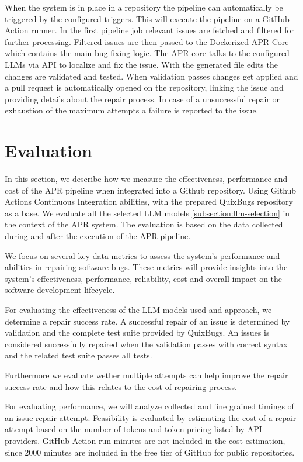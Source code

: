 When the system is in place in a repository the pipeline can automatically be triggered by the configured triggers. This will execute the pipeline on a GitHub Action runner. In the first pipeline job relevant issues are fetched and filtered for further processing. Filtered issues are then passed to the Dockerized APR Core which contains the main bug fixing logic. The APR core talks to the configured LLMs via API to localize and fix the issue. With the generated file edits the changes are validated and tested. When validation passes changes get applied and a pull request is automatically opened on the repository, linking the issue and providing details about the repair process. In case of a unsuccessful repair or exhaustion of the maximum attempts a failure is reported to the issue.

\section{Evaluation} \label{section:evaluation}
In this section, we describe how we measure the effectiveness, performance and cost of the APR pipeline when integrated into a Github repository. Using Github Actions Continuous Integration abilities, with the prepared QuixBugs repository as a base. We evaluate all the selected LLM models \ref{subsection:llm-selection} in the context of the APR system. The evaluation is based on the data collected during and after the execution of the APR pipeline.

We focus on several key data metrics to assess the system's performance and abilities in repairing software bugs. These metrics will provide insights into the system's effectiveness, performance, reliability, cost and overall impact on the software development lifecycle.

For evaluating the effectiveness of the LLM models used and approach, we determine a repair success rate. A successful repair of an issue is determined by validation and the complete test suite provided by QuixBugs. An issues is considered successfully repaired when the validation passes with correct syntax and the related test suite passes all tests.

Furthermore we evaluate wether multiple attempts can help improve the repair success rate and how this relates to the cost of repairing process.

For evaluating performance, we will analyze collected and fine grained timings of an issue repair attempt. Feasibility is evaluated by estimating the cost of a repair attempt based on the number of tokens and token pricing listed by API providers. GitHub Action run minutes are not included in the cost estimation, since 2000 minutes are included in the free tier of GitHub for public repositories.

